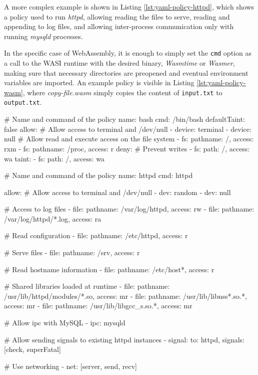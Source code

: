 A more complex example is shown in Listing \ref{lst:yaml-policy-httpd}, which shows a policy
used to run \textit{httpd}, allowing reading the files to serve, reading and appending to log files,
and allowing inter-process communication only with running \textit{mysqld} processes.

In the specific case of WebAssembly, it is enough to simply set the \texttt{cmd} option as
a call to the WASI runtime with the desired binary, \textit{Wasmtime} or \textit{Wasmer}, making sure that
necessary directories are preopened and eventual environment variables are imported.
An example policy is visible in Listing \ref{lst:yaml-policy-wasm}, where \textit{copy-file.wasm} simply copies
the content of \texttt{input.txt} to \texttt{output.txt}.

\begin{code}[language=yaml, caption=A policy for running bash., label=lst:yaml-policy-bash]
# Name and command of the policy
name: bash
cmd: /bin/bash
defaultTaint: false
allow:
  # Allow access to terminal and /dev/null
  - device: terminal
  - device: null
  # Allow read and execute access on the file system
  - fs: {pathname: /, access: rxm}
  - fs: {pathname: /proc, access: r}
deny:
  # Prevent writes
  - fs: {path: /, access: wa}
taint:
  - fs: {path: /, access: wa}
\end{code}

\begin{code}[language=yaml, caption=A policy for HTTPD., label=lst:yaml-policy-httpd]
# Name and command of the policy
name: httpd
cmd: httpd

allow:
  # Allow access to terminal and /dev/null
  - dev: random
  - dev: null

  # Access to log files
  - file: {pathname: /var/log/httpd, access: rw}
  - file: {pathname: /var/log/httpd/*.log, access: ra}

  # Read configuration
  - file: {pathname: /etc/httpd, access: r}

  # Serve files
  - file: {pathname: /srv, access: r}

  # Read hostname information
  - file: {pathname: /etc/host*, access: r}

  # Shared libraries loaded at runtime
  - file: {pathname: /usr/lib/httpd/modules/*.so,
           access: mr}
  - file: {pathname: /usr/lib/libnss*.so.*, access: mr}
  - file: {pathname: /usr/lib/libgcc_s.so.*, access: mr}

  # Allow ipc with MySQL
  - ipc: mysqld

 # Allow sending signals to existing httpd instances
  - signal: {to: httpd, signals: [check, superFatal]}

  # Use networking
  - net: [server, send, recv]
\end{code}

